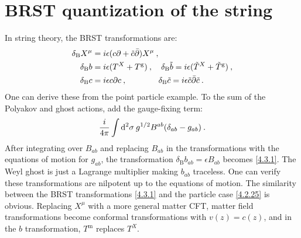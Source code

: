 \section{\texorpdfstring{BRST quantization of the string}{BRST quantization of the string}} \label{sec:4.3}

In string theory, the BRST transformations are:
\begin{subequations}\label{4.3.1}
	\begin{align}
		\delta_{\mathrm{B}} X^{\mu} &= i \epsilon(c \partial+\tilde{c} \bar{\partial}) X^{\mu} \:, \label{4.3.1a} \\
		\delta_{\mathrm{B}} b &= i \epsilon(T^{X}+T^{\mathrm{g}}) \:, \quad 
		\delta_{\mathrm{B}} \tilde{b}=i \epsilon(\tilde{T}^{X}+\tilde{T}^{\mathrm{g}}) \:, \label{4.3.1b} \\
		\delta_{\mathrm{B}} c &= i \epsilon c \partial c \:, \qquad \quad \:\:\:\:\delta_{\mathrm{B}} \tilde{c}=i \epsilon \tilde{c} \bar{\partial} \tilde{c} \:. \label{4.3.1c}
	\end{align}
\end{subequations}
One can derive these from the point particle example. To the sum of the Polyakov and ghost actions, add the gauge-fixing term:
\begin{equation}
	\frac{i}{4 \pi} \int \mathrm{d}^{2} \sigma \: g^{1 / 2} B^{a b}(\delta_{a b}-g_{a b}) \:. \label{4.3.2}
\end{equation}
After integrating over $B_{ab}$ and replacing $B_{ab}$ in the transformations with the equations of motion for $g_{ab}$, the transformation $\delta_{\mathrm{B}} b_{a b}=\epsilon B_{a b}$ becomes \eqref{4.3.1}. The Weyl ghost is just a Lagrange multiplier making $b_{ab}$ traceless. One can verify these transformations are nilpotent up to the equations of motion. The similarity between the BRST transformations \eqref{4.3.1} and the particle case \eqref{4.2.25} is obvious. Replacing $X^{\mu}$ with a more general matter CFT, matter field transformations become conformal transformations with $v(z)=c(z)$, and in the $b$ transformation, $T^{\mathrm{m}}$ replaces $T^{X}$.

